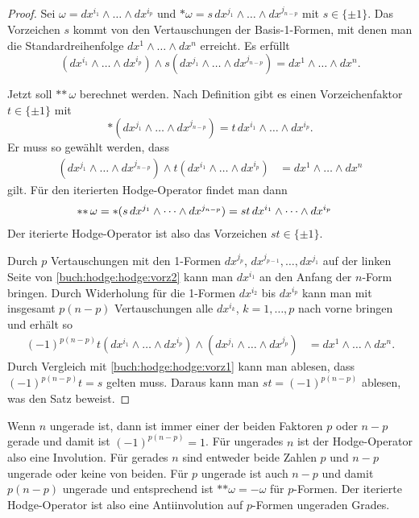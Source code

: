 \begin{proof}
Sei $\omega = dx^{i_1}\wedge\dots\wedge dx^{i_p}$ und 
$\ast\omega = s\,dx^{j_1}\wedge\dots\wedge dx^{j_{n-p}}$ mit
$s\in\{\pm 1\}$.
Das Vorzeichen $s$ kommt von den Vertauschungen der Basis-1-Formen,
mit denen man die Standardreihenfolge $dx^1\wedge \dots\wedge dx^n$
erreicht.
Es erfüllt
\begin{equation}
(dx^{i_1}\wedge\dots\wedge dx^{i_p})
\wedge
s(dx^{j_1}\wedge\dots\wedge dx^{j_{n-p}})
=
dx^1\wedge\dots\wedge dx^n.
\label{buch:hodge:hodge:vorz1}
\end{equation}

Jetzt soll $\ast{\ast\,\omega}$ berechnet werden.
Nach Definition gibt es einen Vorzeichenfaktor $t\in\{\pm1\}$ mit
\[
\ast(dx^{j_1}\wedge\dots\wedge dx^{j_{n-p}})
=
t\,dx^{i_1}\wedge\dots\wedge dx^{i_p}.
\]
Er muss so gewählt werden, dass
\begin{align}
(dx^{j_1}\wedge\dots\wedge dx^{j_{n-p}})
\wedge
t(dx^{i_1}\wedge\dots\wedge dx^{i_p})
&=
dx^1\wedge\dots\wedge dx^n
\label{buch:hodge:hodge:vorz2}
\end{align}
gilt.
Für den iterierten Hodge-Operator findet man dann
\begin{align}
\ast{\ast\, \omega}
=
\ast(s\,dx^{j_1}\wedge\dots\wedge dx^{j_{n-p}})
&=
st\, dx^{i_1}\wedge\dots\wedge dx^{i_p}
\notag
\end{align}
Der iterierte Hodge-Operator ist also das Vorzeichen $st\in\{\pm 1\}$.

Durch $p$ Vertauschungen mit den 1-Formen $dx^{j_p}$,
$dx^{j_{p-1}},\dots,dx^{j_1}$ auf der linken Seite von
\eqref{buch:hodge:hodge:vorz2}
kann man $dx^{i_1}$ an den Anfang
der $n$-Form bringen.
Durch Widerholung für die 1-Formen $dx^{i_2}$ bis $dx^{i_p}$ kann
man mit insgesamt $p(n-p)$ Vertauschungen alle $dx^{i_k}$, $k=1,\dots,p$
nach vorne bringen und erhält so
\begin{align}
(-1)^{p(n-p)}
t(dx^{i_1}\wedge\dots\wedge dx^{i_p})
\wedge
(dx^{j_1}\wedge\dots\wedge dx^{j_p})
&=
dx^1\wedge\dots\wedge dx^n.
\end{align}
Durch Vergleich mit 
\eqref{buch:hodge:hodge:vorz1}
kann man ablesen, dass $(-1)^{p(n-p)}t=s$ gelten muss.
Daraus kann man
$st=(-1)^{p(n-p)}$ ablesen, was den Satz beweist.
\end{proof}

Wenn $n$ ungerade ist, dann ist immer einer der beiden Faktoren $p$
oder $n-p$ gerade und damit ist $(-1)^{p(n-p)}=1$.
Für ungerades $n$ ist der Hodge-Operator also eine Involution.
Für gerades $n$ sind entweder beide Zahlen $p$ und $n-p$ ungerade
oder keine von beiden.
Für $p$ ungerade ist auch $n-p$ und damit $p(n-p)$ ungerade
und entsprechend ist $\ast{\ast\omega}=-\omega$ für $p$-Formen.
Der iterierte Hodge-Operator ist also eine Antiinvolution auf
$p$-Formen ungeraden Grades.

